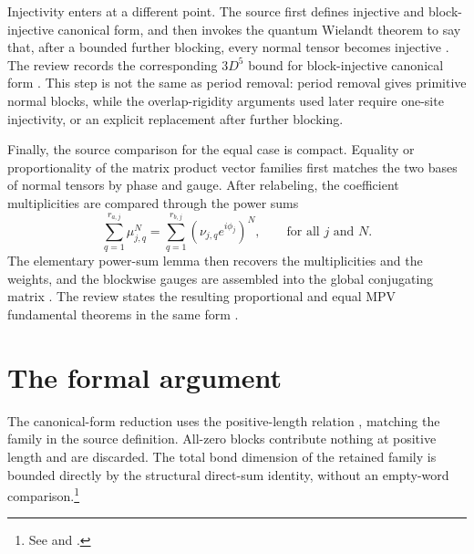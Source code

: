 \documentclass{article}
\begin{document}
Injectivity enters at a different point. The source first defines injective and
block-injective canonical form, and then invokes the quantum Wielandt theorem to
say that, after a bounded further blocking, every normal tensor becomes injective
\cite[lines~317--332]{Cirac2016MPDO_arXiv}. The review records the corresponding
$3D^5$ bound for block-injective canonical form
\cite[lines~2120--2124]{Cirac2021Matrix}.
This step is not the same as period removal: period removal gives primitive normal
blocks, while the overlap-rigidity arguments used later require one-site
injectivity, or an explicit replacement after further blocking.

Finally, the source comparison for the equal case is compact. Equality or
proportionality of the matrix product vector families first matches the two bases
of normal tensors by phase and gauge. After relabeling, the coefficient
multiplicities are compared through the power sums
\[
  \sum_{q=1}^{r_{a,j}} \mu_{j,q}^N
  = \sum_{q=1}^{r_{b,j}} (\nu_{j,q}e^{i\phi_j})^N,
  \qquad \text{for all } j \text{ and } N.
\]
The elementary power-sum lemma then recovers the multiplicities and the weights,
and the blockwise gauges are assembled into the global conjugating matrix
\cite[lines~1181--1192]{Cirac2016MPDO_arXiv}. The review states the resulting
proportional and equal MPV fundamental theorems in the same form
\cite[lines~1891--1900]{Cirac2021Matrix}.

\section{The formal argument}

The canonical-form reduction uses the positive-length relation
, matching the family in the source definition. All-zero
blocks contribute nothing at positive length and are discarded. The total bond
dimension of the retained family is bounded directly by the structural
direct-sum identity, without an empty-word comparison.\footnote{See
 and
.}
\end{document}
